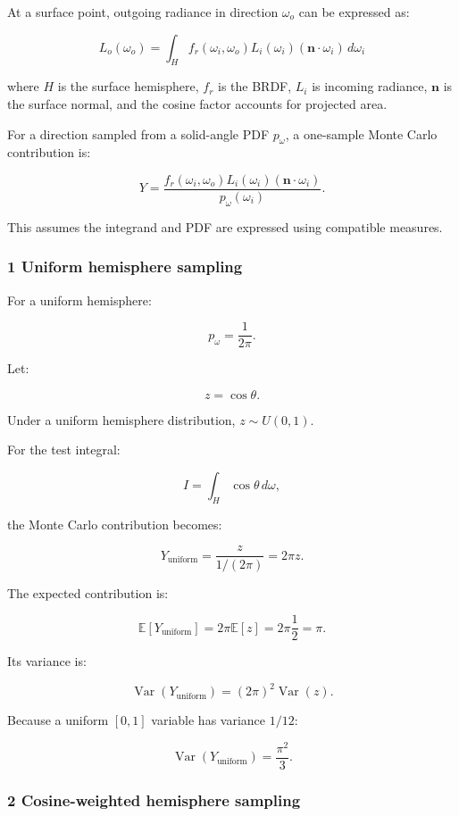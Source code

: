 At a surface point, outgoing radiance in direction \(\omega_o\) can be expressed as:

\[
 \boxed{ L_o(\omega_o) = \int_H f_r(\omega_i,\omega_o) L_i(\omega_i) (\mathbf n\cdot\omega_i)\,d\omega_i }
\]

where \(H\) is the surface hemisphere, \(f_r\) is the BRDF, \(L_i\) is incoming radiance, \(\mathbf n\) is the surface normal, and the cosine factor accounts for projected area.

For a direction sampled from a solid-angle PDF \(p_\omega\), a one-sample Monte Carlo contribution is:

\[
 \boxed{ Y= \frac{ f_r(\omega_i,\omega_o) L_i(\omega_i) (\mathbf n\cdot\omega_i) }{ p_\omega(\omega_i) } }.
\]

This assumes the integrand and PDF are expressed using compatible measures.

\subsubsection{1 Uniform hemisphere sampling}\label{02-foundations-ii-ch031-uniform-hemisphere-sampling}

\hypertarget{02-foundations-ii-ch031-uniform-hemisphere-sampling}{}

For a uniform hemisphere:

\[
 p_\omega=\frac1{2\pi}.
\]

Let:

\[
 z=\cos\theta.
\]

Under a uniform hemisphere distribution, \(z\sim U(0,1)\).

For the test integral:

\[
 I=\int_H\cos\theta\,d\omega,
\]

the Monte Carlo contribution becomes:

\[
 Y_{\mathrm{uniform}} = \frac z{1/(2\pi)} =2\pi z.
\]

The expected contribution is:

\[
 \mathbb E[Y_{\mathrm{uniform}}] = 2\pi\mathbb E[z] =2\pi\frac12 =\pi.
\]

Its variance is:

\[
 \operatorname{Var}(Y_{\mathrm{uniform}}) = (2\pi)^2\operatorname{Var}(z).
\]

Because a uniform \([0,1]\) variable has variance \(1/12\):

\[
 \boxed{ \operatorname{Var}(Y_{\mathrm{uniform}}) = \frac{\pi^2}{3} }.
\]

\subsubsection{2 Cosine-weighted hemisphere sampling}\label{02-foundations-ii-ch031-cosine-weighted-hemisphere-sampling}

